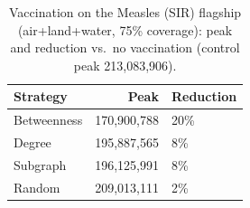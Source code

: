 \begin{table}[t]
\centering
\caption{Vaccination on the Measles (SIR) flagship (air+land+water, 75\% coverage): peak and reduction vs.\ no vaccination (control peak 213,083,906).}
\label{tab:vacc}
\begin{tabular}{lrl}
\toprule
Strategy & Peak & Reduction \\
\midrule
Betweenness & 170,900,788 & 20\% \\
Degree & 195,887,565 & 8\% \\
Subgraph & 196,125,991 & 8\% \\
Random & 209,013,111 & 2\% \\
\bottomrule
\end{tabular}
\end{table}
